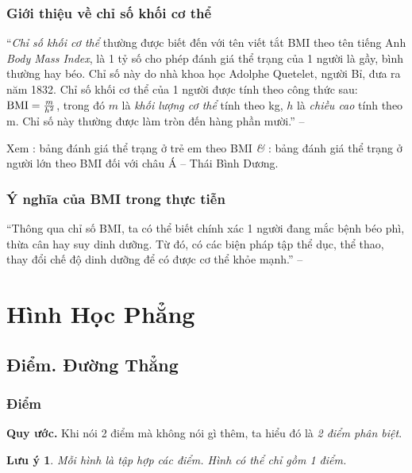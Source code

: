 \documentclass{article}
\numberwithin{equation}{section}
\newtheorem{remark}{Lưu ý}[section]
\begin{document}
\subsubsection{Giới thiệu về chỉ số khối cơ thể}
``\textit{Chỉ số khối cơ thể} thường được biết đến với tên viết tắt BMI theo tên tiếng Anh \textit{Body Mass Index}, là 1 tỷ số cho phép đánh giá thể trạng của 1 người là gầy, bình thường hay béo. Chỉ số này do nhà khoa học Adolphe Quetelet, người Bỉ, đưa ra năm 1832. Chỉ số khối cơ thể của 1 người được tính theo công thức sau: ${\rm BMI} = \frac{m}{h^2}$, trong đó $m$ là \textit{khối lượng cơ thể} tính theo kg, $h$ là \textit{chiều cao} tính theo m. Chỉ số này thường được làm tròn đến hàng phần mười.'' -- \cite[p. 73]{Thai_Anh_Dat_Ha_Loan_Nam_Quang_Toan_6_tap_2}

Xem \cite[Hình 1, p. 73]{Thai_Anh_Dat_Ha_Loan_Nam_Quang_Toan_6_tap_2}: bảng đánh giá thể trạng ở trẻ em theo BMI \textit{\&} \cite[p. 74]{Thai_Anh_Dat_Ha_Loan_Nam_Quang_Toan_6_tap_2}: bảng đánh giá thể trạng ở người lớn theo BMI đối với châu Á -- Thái Bình Dương.

\subsubsection{Ý nghĩa của BMI trong thực tiễn}
``Thông qua chỉ số BMI, ta có thể biết chính xác 1 người đang mắc bệnh béo phì, thừa cân hay suy dinh dưỡng. Từ đó, có các biện pháp tập thể dục, thể thao, thay đổi chế độ dinh dưỡng để có được cơ thể khỏe mạnh.'' -- \cite[p. 74]{Thai_Anh_Dat_Ha_Loan_Nam_Quang_Toan_6_tap_2}


\section{Hình Học Phẳng}

\subsection{Điểm. Đường Thẳng}

\subsubsection{Điểm}
\textbf{Quy ước.} Khi nói 2 điểm mà không nói gì thêm, ta hiểu đó là \textit{2 điểm phân biệt}.

\begin{remark}
	Mỗi hình là tập hợp các điểm. Hình có thể chỉ gồm 1 điểm.
\end{remark}
\end{document}
